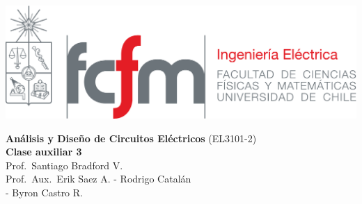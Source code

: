 \documentclass[
  11pt,
  letterpaper,
   addpoints,
   answers
  ]{exam}
\begin{document}
\noindent
\begin{minipage}{0.47\textwidth}
\includegraphics[width=\textwidth]{../fcfm_die}
\end{minipage}
\begin{minipage}{0.53\textwidth}
    
\begin{center} 
\large\textbf{Análisis y Diseño de Circuitos Eléctricos} (EL3101-2) \\
\large\textbf{Clase auxiliar 3} \\
\normalsize Prof.~Santiago Bradford V.\\
\normalsize Prof.~Aux.~Erik Saez A. - Rodrigo Catalán\\
             - Byron Castro R.
\end{center}
\end{minipage}

\vspace{0.5cm}
\noindent
\vspace{.85cm}
\end{document}

